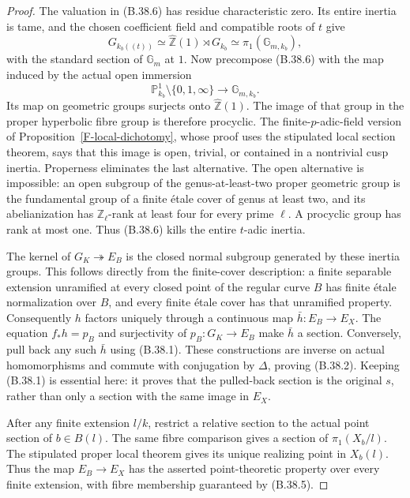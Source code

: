 \documentclass[11pt,oneside]{article}
\begin{document}
\begin{proof}
The valuation in (B.38.6) has residue characteristic
zero. Its entire inertia is tame, and the chosen
coefficient field and compatible roots of $t$ give
\[
 G_{k_b((t))}\simeq
 \widehat{\mathbb Z}(1)\rtimes G_{k_b}
 \simeq\pi_1(\mathbb G_{m,k_b}),
 \tag{B.38.7}
\]
with the standard section of $\mathbb G_m$ at $1$.
Now precompose (B.38.6) with the map induced by the
actual open immersion
\[
 \mathbb P^1_{k_b}\setminus\{0,1,\infty\}
           \longrightarrow\mathbb G_{m,k_b}.
 \tag{B.38.8}
\]
Its map on geometric groups surjects onto
$\widehat{\mathbb Z}(1)$. The image of that group
in the proper hyperbolic fibre group is therefore
procyclic. The finite-$p$-adic-field version of
Proposition~\ref{F-local-dichotomy}, whose proof
uses the stipulated local section theorem, says
that this image is open, trivial, or contained in a
nontrivial cusp inertia. Properness eliminates the
last alternative. The open alternative is impossible:
an open subgroup of the genus-at-least-two proper
geometric group is the fundamental group of a finite
\'etale cover of genus at least two, and its
abelianization has $\mathbb Z_\ell$-rank at least
four for every prime $\ell$. A procyclic group has
rank at most one. Thus (B.38.6) kills the entire
$t$-adic inertia.

The kernel of $G_K\twoheadrightarrow E_B$ is the
closed normal subgroup generated by these inertia
groups. This follows directly from the finite-cover
description: a finite separable extension unramified
at every closed point of the regular curve $B$ has
finite \'etale normalization over $B$, and every
finite \'etale cover has that unramified property.
Consequently $h$ factors uniquely through a continuous
map $\bar h:E_B\to E_X$. The equation $f_*h=p_B$
and surjectivity of $p_B:G_K\to E_B$ make $\bar h$
a section. Conversely, pull back any such $\bar h$
using (B.38.1). These constructions are inverse on
actual homomorphisms and commute with conjugation by
$\Delta$, proving (B.38.2). Keeping (B.38.1) is
essential here: it proves that the pulled-back section
is the original $s$, rather than only a section with
the same image in $E_X$.

After any finite extension $l/k$, restrict a relative
section to the actual point section of $b\in B(l)$.
The same fibre comparison gives a section of
$\pi_1(X_b/l)$. The stipulated proper local theorem
gives its unique realizing point in $X_b(l)$. Thus
the map $E_B\to E_X$ has the asserted point-theoretic
property over every finite extension, with fibre
membership guaranteed by (B.38.5).


\end{proof}
\end{document}
